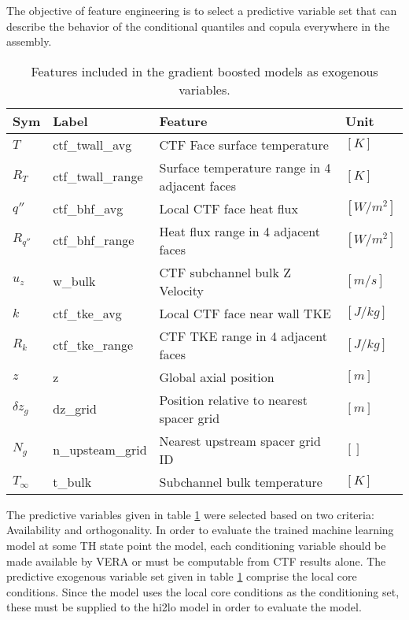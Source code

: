The objective of feature engineering is to select a predictive variable set that can describe the behavior of the conditional quantiles and copula everywhere in the assembly.

\begin{table}[h]
    \begin{center}
    \caption[Included exogenous training features.]{Features included in the gradient boosted models as exogenous variables.}
\begin{tabular}[h]{|l | l | l | l |}
    \hline
    Sym & Label & Feature & Unit \\
    \hline
    \hline
    $T$ & ctf\_twall\_avg & CTF Face surface temperature & $[K]$ \\
    $R_T$ & ctf\_twall\_range & Surface temperature range in 4 adjacent faces & $[K]$ \\
    $q''$ & ctf\_bhf\_avg & Local CTF face heat flux & $[W/m^2]$ \\
    $R_{q''}$ & ctf\_bhf\_range & Heat flux range in 4 adjacent faces & $[W/m^2]$ \\
    $u_z$ & w\_bulk & CTF subchannel bulk Z Velocity &  $[m/s]$ \\
    $k$ & ctf\_tke\_avg & Local CTF face near wall TKE &  $[J/kg]$ \\
    $R_k$ & ctf\_tke\_range & CTF TKE range in 4 adjacent faces & $[J/kg]$ \\
    $z$ & z & Global axial position & $[m]$ \\
    $\delta z_g$ & dz\_grid & Position relative to nearest spacer grid & $[m]$ \\
    $N_g$ & n\_upsteam\_grid  & Nearest upstream spacer grid ID & $[]$ \\
    $T_\infty$ & t\_bulk & Subchannel bulk temperature  &  $[K]$ \\
    \hline
\end{tabular}
\label{tab:features}
\end{center}
\end{table}

The predictive variables given in table \ref{tab:features} were selected based on two criteria:  Availability and orthogonality.  In order to evaluate the trained machine learning model at some TH state point the model, each conditioning variable should be made available by VERA or must be computable from CTF results alone.   The predictive exogenous variable set given in table \ref{tab:features} comprise the local core conditions.  Since the model uses the local core conditions as the conditioning set, these must be supplied to the hi2lo model in order to evaluate the model.

